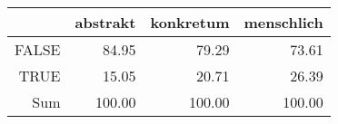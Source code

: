 \begin{tabular}{rrrr}
  \hline
 & abstrakt & konkretum & menschlich \\ 
  \hline
FALSE & 84.95 & 79.29 & 73.61 \\ 
  TRUE & 15.05 & 20.71 & 26.39 \\ 
  Sum & 100.00 & 100.00 & 100.00 \\ 
   \hline
\end{tabular}
